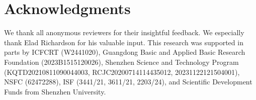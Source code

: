 \documentclass[10pt,twocolumn,letterpaper]{article}
\begin{document}
\title{\paperTitle}
\author{\authorBlock}
\maketitle















\section*{Acknowledgments}
We thank all anonymous reviewers for their insightful feedback.
We especially thank Elad Richardson for his valuable input.
This research was supported in parts by ICFCRT (W2441020), Guangdong Basic and Applied Basic Research Foundation (2023B1515120026), Shenzhen Science and Technology Program (KQTD20210811090044003, RCJC20200714114435012, 20231122121504001), NSFC (62472288), ISF (3441/21, 3611/21, 2203/24), and Scientific Development Funds from Shenzhen University.




{\small


}


\clearpage 
\appendix

\end{document}
